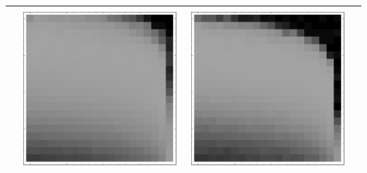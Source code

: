 \documentclass[10pt]{article}
\begin{document}
\begin{tabular}{|c|c|c|c|}
        & \includegraphics[scale=0.25]{plots/simple/LF-40T10T-20T10-MNIST-6.png}
        & \includegraphics[scale=0.25]{plots/simple/LF-40T20T10T-20T10-MNIST-6.png} \\ \hline

\end{tabular}
\end{document}
